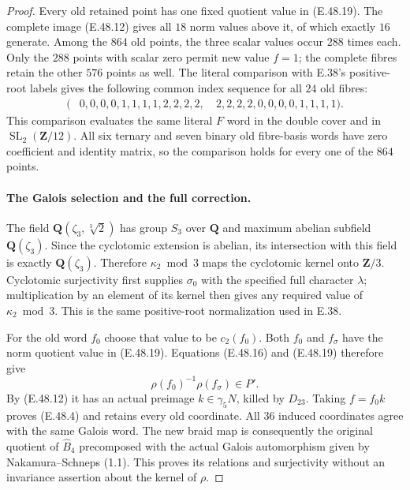 \begin{proof}
Every old retained point has one fixed quotient value in
\textup{(E.48.19)}.
The complete image \textup{(E.48.12)} gives all $18$ norm
values above it, of which exactly $16$ generate.
Among the $864$ old points, the three scalar values occur
$288$ times each.
Only the $288$ points with scalar zero permit new value $f=1$;
the complete fibres retain the other $576$ points as well.
The literal comparison with E.38's positive-root labels gives
the following common index sequence for all $24$ old fibres:
\[
 \begin{split}
 (&0,0,0,0,1,1,1,1,2,2,2,2,\
  &2,2,2,2,0,0,0,0,1,1,1,1).
 \end{split}
 \tag{E.48.21}
\]
This comparison evaluates the same literal $F$ word in the
double cover and in $\operatorname{SL}_2(\mathbf Z/12)$.
All six ternary and seven binary old fibre-basis words have
zero coefficient and identity matrix, so the comparison
holds for every one of the $864$ points.

\paragraph{The Galois selection and the full correction.}
The field
$\mathbf Q(\zeta_3,\sqrt[3]{2})$ has group $S_3$ over
$\mathbf Q$ and maximum abelian subfield
$\mathbf Q(\zeta_3)$.
Since the cyclotomic extension is abelian, its intersection
with this field is exactly $\mathbf Q(\zeta_3)$.
Therefore $\kappa_2\bmod3$ maps the cyclotomic kernel onto
$\mathbf Z/3$.
Cyclotomic surjectivity first supplies $\sigma_0$ with the
specified full character $\lambda$; multiplication by an
element of its kernel then gives any required value of
$\kappa_2\bmod3$.
This is the same positive-root normalization used in E.38.

For the old word $f_0$ choose that value to be $c_2(f_0)$.
Both $f_0$ and $f_\sigma$ have the norm quotient value in
\textup{(E.48.19)}.
Equations \textup{(E.48.16)} and \textup{(E.48.19)} therefore
give
\[
              \rho(f_0)^{-1}\rho(f_\sigma)\in P'.
 \tag{E.48.22}
\]
By \textup{(E.48.12)} it has an actual preimage
$k\in\gamma_5N$, killed by $D_{23}$.
Taking $f=f_0k$ proves \textup{(E.48.4)} and retains every
old coordinate.
All $36$ induced coordinates agree with the same Galois word.
The new braid map is consequently the original quotient of
$\widehat B_4$ precomposed with the actual Galois automorphism
given by Nakamura--Schneps (1.1).
This proves its relations and surjectivity without an
invariance assertion about the kernel of $\rho$.


\end{proof}
